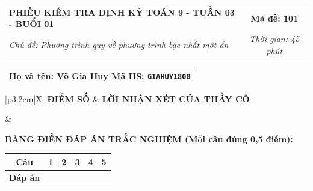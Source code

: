 \documentclass[12pt,a4paper]{article}
\begin{document}
\newpage



\noindent
\begin{tabularx}{\linewidth}{|X|c|}
\hline
\textbf{PHIẾU KIỂM TRA ĐỊNH KỲ TOÁN 9 - TUẦN 03 - BUỔI 01} & \textbf{Mã đề: 101} \\
\textit{Chủ đề: Phương trình quy về phương trình bậc nhất một ẩn} & \textit{Thời gian: 45 phút} \\
\hline
\end{tabularx}

\vspace{1mm}

\noindent
\begin{tabularx}{\linewidth}{|X|}
\hline
\rule[-2mm]{0pt}{7.5mm}\textbf{Họ và tên:} \textbf{\large Võ Gia Huy} \hfill \textbf{Mã HS:} \texttt{GIAHUY1808} \quad \\
\hline
\end{tabularx}

\vspace{1mm}

\noindent
\begin{tabularx}{\linewidth}{|p{3.2cm}|X|}
\hline
\centering\textbf{ĐIỂM SỐ} & \centering\textbf{LỜI NHẬN XÉT CỦA THẦY CÔ} \tabularnewline
\hline
\rule{0pt}{1.3cm} & \tabularnewline
\hline
\end{tabularx}

\vspace{1.2mm}

\noindent\textbf{BẢNG ĐIỀN ĐÁP ÁN TRẮC NGHIỆM (Mỗi câu đúng 0,5 điểm):}
\vspace{0.8mm}

\noindent
\renewcommand{\arraystretch}{1.35}
\begin{tabularx}{\linewidth}{|c|*{5}{>{\centering\arraybackslash}X|}}
\hline
\textbf{Câu} & \textbf{1} & \textbf{2} & \textbf{3} & \textbf{4} & \textbf{5} \\
\hline
\textbf{Đáp án} & & & & & \\
\hline
\end{tabularx}
\renewcommand{\arraystretch}{1.0}

\vspace{1.5mm}
\end{document}
